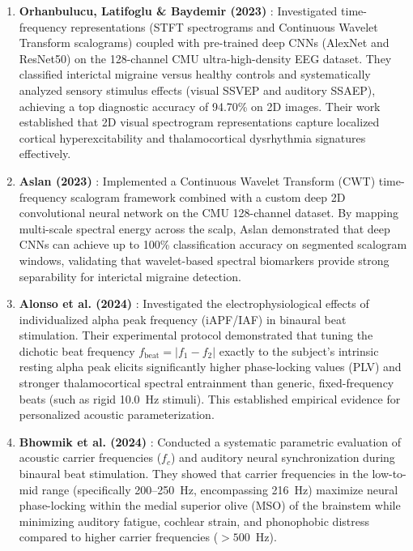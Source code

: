 \documentclass[12pt, a4paper]{report}
\begin{document}
\begin{enumerate}
    \item \textbf{Orhanbulucu, Latifoglu \& Baydemir (2023)} \cite{orhanbulucu2023hybrid}: Investigated time-frequency representations (STFT spectrograms and Continuous Wavelet Transform scalograms) coupled with pre-trained deep CNNs (AlexNet and ResNet50) on the 128-channel CMU ultra-high-density EEG dataset. They classified interictal migraine versus healthy controls and systematically analyzed sensory stimulus effects (visual SSVEP and auditory SSAEP), achieving a top diagnostic accuracy of 94.70\% on 2D images. Their work established that 2D visual spectrogram representations capture localized cortical hyperexcitability and thalamocortical dysrhythmia signatures effectively.
    
    \item \textbf{Aslan (2023)} \cite{aslan2023migrainecnn}: Implemented a Continuous Wavelet Transform (CWT) time-frequency scalogram framework combined with a custom deep 2D convolutional neural network on the CMU 128-channel dataset. By mapping multi-scale spectral energy across the scalp, Aslan demonstrated that deep CNNs can achieve up to 100\% classification accuracy on segmented scalogram windows, validating that wavelet-based spectral biomarkers provide strong separability for interictal migraine detection.
    
    \item \textbf{Alonso et al. (2024)} \cite{alonso2024individualized}: Investigated the electrophysiological effects of individualized alpha peak frequency (iAPF/IAF) in binaural beat stimulation. Their experimental protocol demonstrated that tuning the dichotic beat frequency $f_{\text{beat}} = |f_1 - f_2|$ exactly to the subject's intrinsic resting alpha peak elicits significantly higher phase-locking values (PLV) and stronger thalamocortical spectral entrainment than generic, fixed-frequency beats (such as rigid 10.0~Hz stimuli). This established empirical evidence for personalized acoustic parameterization.
    
    \item \textbf{Bhowmik et al. (2024)} \cite{bhowmik2024carrier}: Conducted a systematic parametric evaluation of acoustic carrier frequencies ($f_c$) and auditory neural synchronization during binaural beat stimulation. They showed that carrier frequencies in the low-to-mid range (specifically 200--250~Hz, encompassing 216~Hz) maximize neural phase-locking within the medial superior olive (MSO) of the brainstem while minimizing auditory fatigue, cochlear strain, and phonophobic distress compared to higher carrier frequencies ($>500$~Hz).
    

\end{enumerate}
\end{document}
